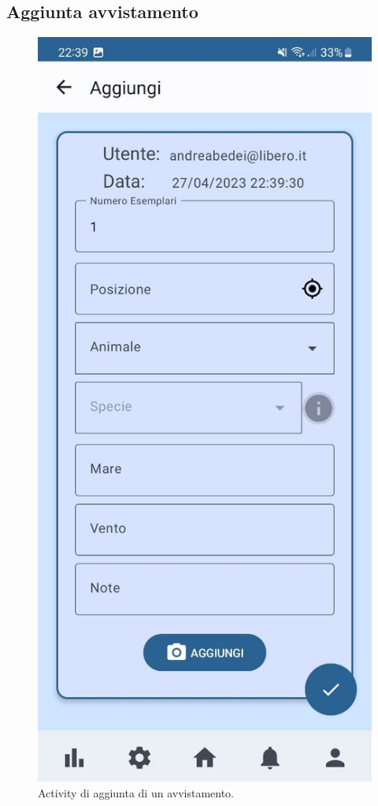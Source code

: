 \documentclass[a4paper,final,12pt]{report}
\begin{document}
\subsection{Aggiunta avvistamento}
\begin{figure}[hbtp]
\centering
\includegraphics[scale=0.19]{img_concettuale/aggmob.jpg}
\caption{Activity di aggiunta di un avvistamento.}
\label{figura:aggMobAvv}
\end{figure}
\end{document}
